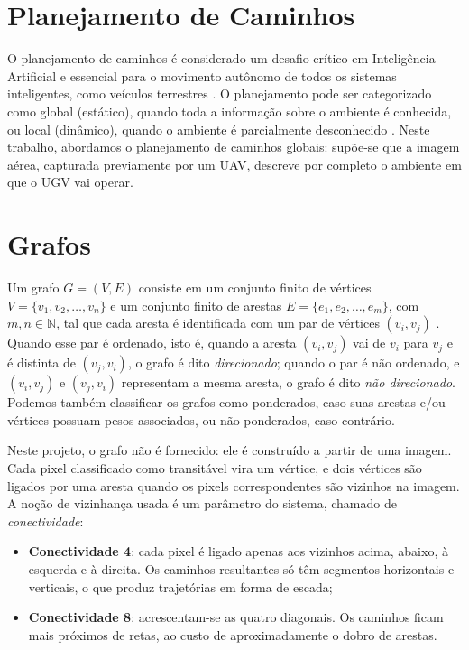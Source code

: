 \documentclass[
    12pt,
    openright,
    oneside,
    a4paper,
    english,
    brazil
]{abntex2}
\begin{document}
\section{Planejamento de Caminhos}

O planejamento de caminhos é considerado um desafio crítico em Inteligência Artificial e essencial para o movimento autônomo de todos os sistemas inteligentes, como veículos terrestres \cite{madridano2021}. O planejamento pode ser categorizado como global (estático), quando toda a informação sobre o ambiente é conhecida, ou local (dinâmico), quando o ambiente é parcialmente desconhecido \cite{chen2020}. Neste trabalho, abordamos o planejamento de caminhos globais: supõe-se que a imagem aérea, capturada previamente por um UAV, descreve por completo o ambiente em que o UGV vai operar.

\section{Grafos}

Um grafo $G = (V, E)$ consiste em um conjunto finito de vértices $V = \{v_1, v_2, \ldots, v_n\}$ e um conjunto finito de arestas $E = \{e_1, e_2, \ldots, e_m\}$, com $m, n \in \mathbb{N}$, tal que cada aresta é identificada com um par de vértices $(v_i, v_j)$ \cite{chen1997}. Quando esse par é ordenado, isto é, quando a aresta $(v_i, v_j)$ vai de $v_i$ para $v_j$ e é distinta de $(v_j, v_i)$, o grafo é dito \emph{direcionado}; quando o par é não ordenado, e $(v_i, v_j)$ e $(v_j, v_i)$ representam a mesma aresta, o grafo é dito \emph{não direcionado}. Podemos também classificar os grafos como ponderados, caso suas arestas e/ou vértices possuam pesos associados, ou não ponderados, caso contrário.

Neste projeto, o grafo não é fornecido: ele é construído a partir de uma imagem. Cada pixel classificado como transitável vira um vértice, e dois vértices são ligados por uma aresta quando os pixels correspondentes são vizinhos na imagem. A noção de vizinhança usada é um parâmetro do sistema, chamado de \emph{conectividade}:

\begin{itemize}
    \item \textbf{Conectividade 4}: cada pixel é ligado apenas aos vizinhos acima, abaixo, à esquerda e à direita. Os caminhos resultantes só têm segmentos horizontais e verticais, o que produz trajetórias em forma de escada;
    \item \textbf{Conectividade 8}: acrescentam-se as quatro diagonais. Os caminhos ficam mais próximos de retas, ao custo de aproximadamente o dobro de arestas.
\end{itemize}
\end{document}
